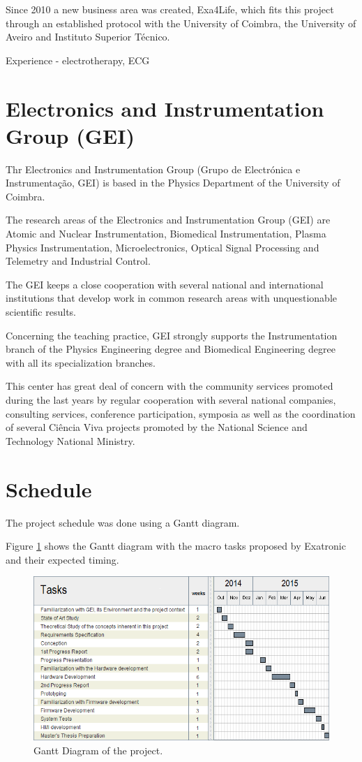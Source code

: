 Since 2010 a new business area was created, Exa4Life, which fits this project through an established protocol with the University of Coimbra, the University of Aveiro and Instituto Superior Técnico.

Experience - electrotherapy, ECG

\section{Electronics and Instrumentation Group (GEI)}

Thr Electronics and Instrumentation Group (Grupo de Electrónica e Instrumentação, GEI) is based in the Physics Department of the University of Coimbra. 

The research areas of the Electronics and Instrumentation Group (GEI) are Atomic and Nuclear Instrumentation, Biomedical Instrumentation, Plasma Physics Instrumentation, Microelectronics, Optical Signal Processing and Telemetry and Industrial Control.

The GEI keeps a close cooperation with several national and international institutions that develop work in common research areas with unquestionable scientific results. 

Concerning the teaching practice, GEI strongly supports the Instrumentation branch of the Physics Engineering degree and Biomedical Engineering degree with all its specialization branches. 

This center has great deal of concern with the community services promoted during the last years by regular cooperation with several national companies, consulting services, conference participation, symposia as well as the coordination of several Ciência Viva projects promoted by the National Science and Technology National Ministry.

\section{Schedule}

The project schedule was done using a Gantt diagram. 

Figure \ref{fig:Gantt} shows the Gantt diagram with the macro tasks proposed by Exatronic and their expected timing.

\begin{figure}[htbp]
\centering
\includegraphics[width=1\textwidth]{Figures/gantt.png}
\caption[Gantt Diagram]{Gantt Diagram of the project.}
\label{fig:Gantt}
\end{figure}